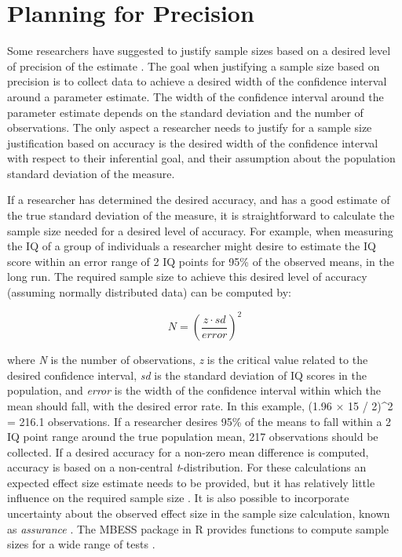 \documentclass[
]{krantz}
\begin{document}
\hypertarget{planning-for-precision}{%
\section{Planning for Precision}\label{planning-for-precision}}

Some researchers have suggested to justify sample sizes based on a desired level of precision of the estimate \citep{cumming_introduction_2016, maxwell_sample_2008, kruschke_rejecting_2018}. The goal when justifying a sample size based on precision is to collect data to achieve a desired width of the confidence interval around a parameter estimate. The width of the confidence interval around the parameter estimate depends on the standard deviation and the number of observations. The only aspect a researcher needs to justify for a sample size justification based on accuracy is the desired width of the confidence interval with respect to their inferential goal, and their assumption about the population standard deviation of the measure.

If a researcher has determined the desired accuracy, and has a good estimate of the true standard deviation of the measure, it is straightforward to calculate the sample size needed for a desired level of accuracy. For example, when measuring the IQ of a group of individuals a researcher might desire to estimate the IQ score within an error range of 2 IQ points for 95\% of the observed means, in the long run. The required sample size to achieve this desired level of accuracy (assuming normally distributed data) can be computed by:

\[N = \left(\frac{z \cdot sd}{error}\right)^2\]

where \emph{N} is the number of observations, \emph{z} is the critical value related to the desired confidence interval, \emph{sd} is the standard deviation of IQ scores in the population, and \emph{error} is the width of the confidence interval within which the mean should fall, with the desired error rate. In this example, (1.96 × 15 / 2)\^{}2 = 216.1 observations. If a researcher desires 95\% of the means to fall within a 2 IQ point range around the true population mean, 217 observations should be collected. If a desired accuracy for a non-zero mean difference is computed, accuracy is based on a non-central \emph{t}-distribution. For these calculations an expected effect size estimate needs to be provided, but it has relatively little influence on the required sample size \citep{maxwell_sample_2008}. It is also possible to incorporate uncertainty about the observed effect size in the sample size calculation, known as \emph{assurance} \citep{kelley_sample_2006}. The MBESS package in R provides functions to compute sample sizes for a wide range of tests \citep{kelley_confidence_2007}.
\end{document}
